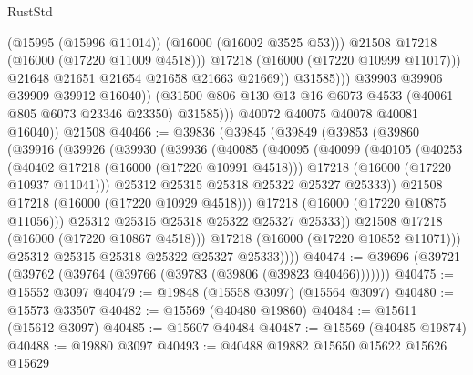 \begin{lexlean}{RustStd}
\begin{coremodule}
                                (@15995 (@15996 @11014))
                                (@16000 (@16002 @3525 @53)))
                              @21508
                              @17218
                              (@16000 (@17220 @11009 @4518)))
                            @17218
                            (@16000 (@17220 @10999 @11017)))
                          @21648
                          @21651
                          @21654
                          @21658
                          @21663
                          @21669))
                      @31585)))
                @39903
                @39906
                @39909
                @39912
                @16040))
            (@31500 @806 @130 @13 @16 @6073 @4533 (@40061 @805 @6073 @23346 @23350) @31585)))
        @40072
        @40075
        @40078
        @40081
        @16040))
    @21508
@40466 := @39836
    (@39845
      (@39849
        (@39853
          (@39860
            (@39916
              (@39926
                (@39930
                  (@39936
                    (@40085
                      (@40095
                        (@40099
                          (@40105
                            (@40253
                              (@40402 @17218 (@16000 (@17220 @10991 @4518)))
                              @17218
                              (@16000 (@17220 @10937 @11041)))
                            @25312
                            @25315
                            @25318
                            @25322
                            @25327
                            @25333))
                        @21508
                        @17218
                        (@16000 (@17220 @10929 @4518)))
                      @17218
                      (@16000 (@17220 @10875 @11056)))
                    @25312
                    @25315
                    @25318
                    @25322
                    @25327
                    @25333))
                @21508
                @17218
                (@16000 (@17220 @10867 @4518)))
              @17218
              (@16000 (@17220 @10852 @11071)))
            @25312
            @25315
            @25318
            @25322
            @25327
            @25333))))
@40474 := @39696 (@39721 (@39762 (@39764 (@39766 (@39783 (@39806 (@39823 @40466)))))))
@40475 := @15552 @3097
@40479 := @19848 (@15558 @3097) (@15564 @3097)
@40480 := @15573 @33507
@40482 := @15569 (@40480 @19860)
@40484 := @15611 (@15612 @3097)
@40485 := @15607 @40484
@40487 := @15569 (@40485 @19874)
@40488 := @19880 @3097
@40493 := @40488 @19882 @15650 @15622 @15626 @15629

\end{coremodule}
\end{lexlean}
